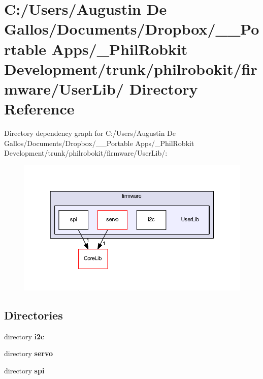 \section{C\-:/\-Users/\-Augustin De Gallos/\-Documents/\-Dropbox/\-\_\-\-\_\-\-Portable Apps/\-\_\-\-Phil\-Robkit Development/trunk/philrobokit/firmware/\-User\-Lib/ Directory Reference}
\label{dir_fee686af6c6db11010045f239819e066}
Directory dependency graph for C\-:/\-Users/\-Augustin De Gallos/\-Documents/\-Dropbox/\-\_\-\-\_\-\-Portable Apps/\-\_\-\-Phil\-Robkit Development/trunk/philrobokit/firmware/\-User\-Lib/\-:\nopagebreak
\begin{figure}[H]
\begin{center}
\leavevmode
\includegraphics[width=350pt]{dir_fee686af6c6db11010045f239819e066_dep}
\end{center}
\end{figure}
\subsection*{Directories}
\begin{DoxyCompactItemize}
\item 
directory {\bf i2c}
\item 
directory {\bf servo}
\item 
directory {\bf spi}
\end{DoxyCompactItemize}
